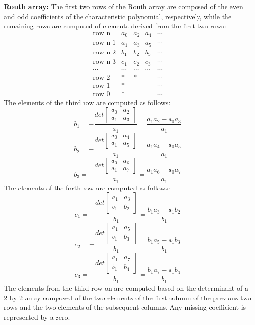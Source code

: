 \documentclass[12pt]{article}
\begin{document}
{\bf Routh array: } The first two rows of the Routh array are composed of
the even and odd coefficients of the characteristic polynomial, respectively,
while the remaining rows are composed of elements derived from the first
two rows:
\[ \begin{array}{lllll}
\mbox{row n}   & a_0 & a_2 & a_4 & \cdots \\
\mbox{row n-1} & a_1 & a_3 & a_5 & \cdots \\
\mbox{row n-2} & b_1 & b_2 & b_3 & \cdots \\
\mbox{row n-3} & c_1 & c_2 & c_3 & \cdots \\
\cdots & \cdots & \cdots & \cdots & \cdots \\
\mbox{row 2} & * & * &  & \cdots \\
\mbox{row 1} & * &   &  & \cdots \\
\mbox{row 0} & * &   &  & \cdots \end{array} \]
The elements of the third row are computed as follows:
\[ b_1=-\frac{det\left[\begin{array}{cc}a_0&a_2\\a_1&a_3\end{array}\right]}{a_1}
=\frac{a_1a_2-a_0a_3}{a_1} \]
\[ b_2=-\frac{det\left[\begin{array}{cc}a_0&a_4\\a_1&a_5\end{array}\right]}{a_1}
=\frac{a_1a_4-a_0a_5}{a_1} \]
\[ b_3=-\frac{det\left[\begin{array}{cc}a_0&a_6\\a_1&a_7\end{array}\right]}{a_1}
=\frac{a_1a_6-a_0a_7}{a_1} \]
The elements of the forth row are computed as follows:
\[ c_1=-\frac{det\left[\begin{array}{cc}a_1&a_3\\b_1&b_2\end{array}\right]}{b_1}
=\frac{b_1a_3-a_1b_2}{b_1} \]
\[ c_2=-\frac{det\left[\begin{array}{cc}a_1&a_5\\b_1&b_3\end{array}\right]}{b_1}
=\frac{b_1a_5-a_1b_3}{b_1} \]
\[ c_3=-\frac{det\left[\begin{array}{cc}a_1&a_7\\b_1&b_4\end{array}\right]}{b_1}
=\frac{b_1a_7-a_1b_4}{b_1} \]
The elements from the third row on are computed based on the determinant of a
2 by 2 array composed of the two elements of the first column of the previous
two rows and the two elements of the subsequent columns. Any missing coefficient
is represented by a zero.
\end{document}
